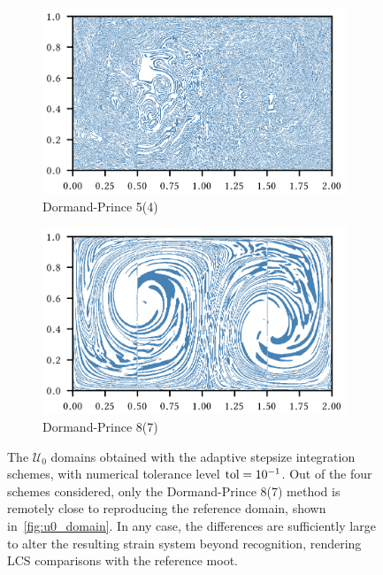 \begin{figure}[htpb]
    \begin{subfigure}[b]{0.475\textwidth}
        \centering
        \includegraphics{figures/domain_figures/rkdp54_err_half_width.png}
        \caption[]{{\small Dormand-Prince 5(4)}}
        \label{fig:u0_dom_err_dp54}
    \end{subfigure}
    \begin{subfigure}[b]{0.475\textwidth}
        \centering
        \includegraphics{figures/domain_figures/rkdp87_err_half_width.png}
        \caption[]{{\small Dormand-Prince 8(7)}}
        \label{fig:u0_dom_err_dp87}
    \end{subfigure}
    \caption[The $\mathcal{U}_{0}$ domains obtained with the adaptive stepsize
    integration schemes, with numerical tolerance level
    $\textnormal{tol}=10^{-1}$]{
        The $\mathcal{U}_{0}$ domains obtained with the adaptive stepsize
        integration schemes, with numerical tolerance level
        $\textnormal{tol}=10^{-1}$. Out of the four schemes considered, only the
    Dormand-Prince 8(7) method is remotely close to reproducing the
    reference domain, shown in~\ref{fig:u0_domain}. In any case, the
    differences are sufficiently large to alter the resulting strain
    system beyond recognition, rendering LCS comparisons with the reference
    moot.}
    \label{fig:u0_dom_errs}
\end{figure}

